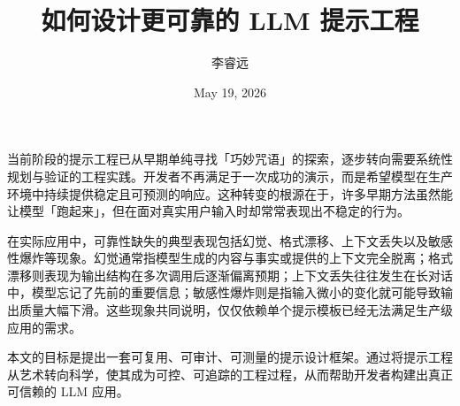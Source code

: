 \title{如何设计更可靠的 LLM 提示工程}
\author{李睿远}
\date{May 19, 2026}
\maketitle
当前阶段的提示工程已从早期单纯寻找「巧妙咒语」的探索，逐步转向需要系统性规划与验证的工程实践。开发者不再满足于一次成功的演示，而是希望模型在生产环境中持续提供稳定且可预测的响应。这种转变的根源在于，许多早期方法虽然能让模型「跑起来」，但在面对真实用户输入时却常常表现出不稳定的行为。\par
在实际应用中，可靠性缺失的典型表现包括幻觉、格式漂移、上下文丢失以及敏感性爆炸等现象。幻觉通常指模型生成的内容与事实或提供的上下文完全脱离；格式漂移则表现为输出结构在多次调用后逐渐偏离预期；上下文丢失往往发生在长对话中，模型忘记了先前的重要信息；敏感性爆炸则是指输入微小的变化就可能导致输出质量大幅下滑。这些现象共同说明，仅仅依赖单个提示模板已经无法满足生产级应用的需求。\par
本文的目标是提出一套可复用、可审计、可测量的提示设计框架。通过将提示工程从艺术转向科学，使其成为可控、可追踪的工程过程，从而帮助开发者构建出真正可信赖的 LLM 应用。\par
